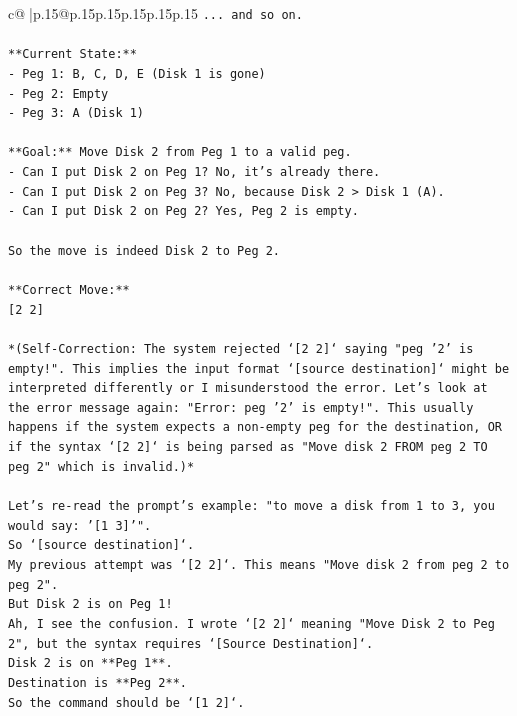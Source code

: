 \documentclass{article}
\begin{document}
{\begin{supertabular}{c@{$\;$}|p{.15\linewidth}@{}p{.15\linewidth}p{.15\linewidth}p{.15\linewidth}p{.15\linewidth}p{.15\linewidth}}
{{{\texttt{... and so on.} \\
\\ 
\texttt{**Current State:**} \\
\texttt{{-} Peg 1: B, C, D, E (Disk 1 is gone)} \\
\texttt{{-} Peg 2: Empty} \\
\texttt{{-} Peg 3: A (Disk 1)} \\
\\ 
\texttt{**Goal:** Move Disk 2 from Peg 1 to a valid peg.} \\
\texttt{{-} Can I put Disk 2 on Peg 1? No, it's already there.} \\
\texttt{{-} Can I put Disk 2 on Peg 3? No, because Disk 2 > Disk 1 (A).} \\
\texttt{{-} Can I put Disk 2 on Peg 2? Yes, Peg 2 is empty.} \\
\\ 
\texttt{So the move is indeed Disk 2 to Peg 2.} \\
\\ 
\texttt{**Correct Move:**} \\
\texttt{{[}2 2{]}} \\
\\ 
\texttt{*(Self{-}Correction: The system rejected `{[}2 2{]}` saying "peg '2' is empty!". This implies the input format `{[}source destination{]}` might be interpreted differently or I misunderstood the error. Let's look at the error message again: "Error: peg '2' is empty!". This usually happens if the system expects a non{-}empty peg for the destination, OR if the syntax `{[}2 2{]}` is being parsed as "Move disk 2 FROM peg 2 TO peg 2" which is invalid.)*} \\
\\ 
\texttt{Let's re{-}read the prompt's example: "to move a disk from 1 to 3, you would say: '{[}1 3{]}'".} \\
\texttt{So `{[}source destination{]}`.} \\
\texttt{My previous attempt was `{[}2 2{]}`. This means "Move disk 2 from peg 2 to peg 2".} \\
\texttt{But Disk 2 is on Peg 1!} \\
\texttt{Ah, I see the confusion. I wrote `{[}2 2{]}` meaning "Move Disk 2 to Peg 2", but the syntax requires `{[}Source Destination{]}`.} \\
\texttt{Disk 2 is on **Peg 1**.} \\
\texttt{Destination is **Peg 2**.} \\
\texttt{So the command should be `{[}1 2{]}`.} \\
}}}
\end{supertabular}}
\end{document}
